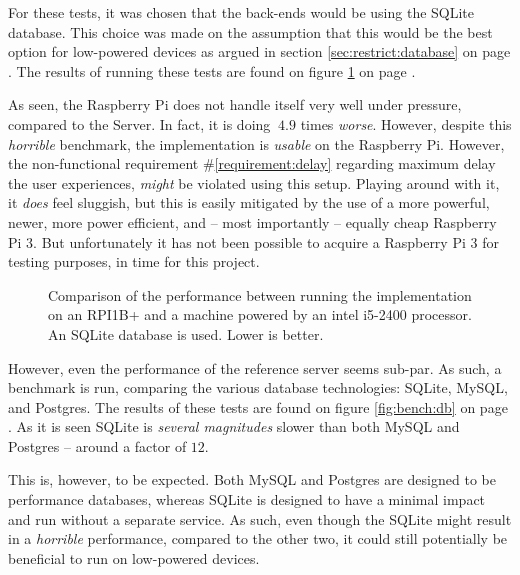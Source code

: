 	For these tests, it was chosen that the back-ends would be using the SQLite database. This choice was made on the assumption that this would be the best option for low-powered devices as argued in section \ref{sec:restrict:database} on page \pageref{sec:restrict:database}. The results of running these tests are found on figure \ref{fig:bench:arch} on page \pageref{fig:bench:arch}. 

	As seen, the Raspberry Pi does not handle itself very well under pressure, compared to the Server. In fact, it is doing $~4.9$ times \emph{worse}. However, despite this \emph{horrible} benchmark, the implementation is \emph{usable} on the Raspberry Pi. However, the non-functional requirement \#\ref{requirement:delay} regarding maximum delay the user experiences, \emph{might} be violated using this setup. Playing around with it, it \emph{does} feel sluggish, but this is easily mitigated by the use of a more powerful, newer, more power efficient, and -- most importantly -- equally cheap Raspberry Pi 3. But unfortunately it has not been possible to acquire a Raspberry Pi 3 for testing purposes, in time for this project.

	\begin{figure}[!h]
		\centering
	    \caption{Comparison of the performance between running the implementation on an RPI1B+ and a machine powered by an intel i5-2400 processor. An SQLite database is used. Lower is better.}
	    \label{fig:bench:arch}
	\end{figure}

	However, even the performance of the reference server seems sub-par. As such, a benchmark is run, comparing the various database technologies: SQLite, MySQL, and Postgres. The results of these tests are found on figure \ref{fig:bench:db} on page \pageref{fig:bench:db}. As it is seen SQLite is \emph{several magnitudes} slower than both MySQL and Postgres -- around a factor of $12$.

	This is, however, to be expected. Both MySQL and Postgres are designed to be performance databases, whereas SQLite is designed to have a minimal impact and run without a separate service. As such, even though the SQLite might result in a \emph{horrible} performance, compared to the other two, it could still potentially be beneficial to run on low-powered devices.

